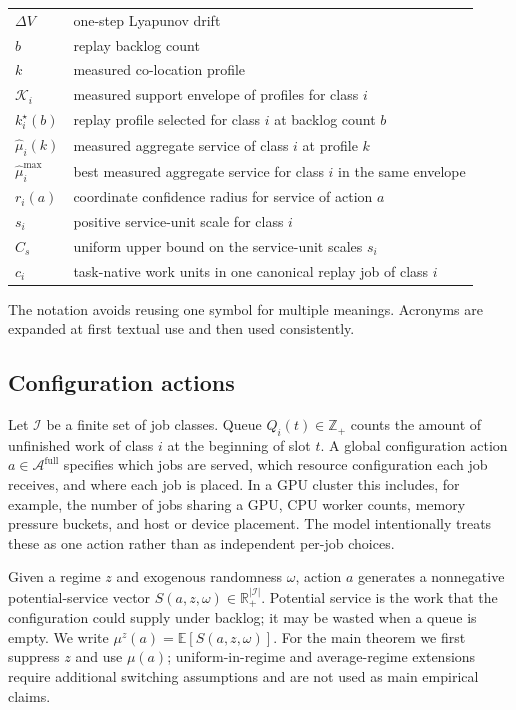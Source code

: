 \documentclass[opre,dblanonrev]{informs4}
\newcommand{\Afull}{\mathcal A^{\mathrm{full}}}
\newcommand{\Real}{\mathbb R}
\newcommand{\E}{\mathbb E}
\begin{document}
\begin{table}[t]
{\begin{tabular}{@{}p{}p{}@{}}
\(\Delta V\) & one-step Lyapunov drift \\
\(b\) & replay backlog count \\
\(k\) & measured co-location profile \\
\(\mathcal K_i\) & measured support envelope of profiles for class \(i\) \\
\(k_i^\star(b)\) & replay profile selected for class \(i\) at backlog count \(b\) \\
\(\widehat\mu_i(k)\) & measured aggregate service of class \(i\) at profile \(k\) \\
\(\widehat\mu_i^{\max}\) & best measured aggregate service for class \(i\) in the same envelope \\
\(r_i(a)\) & coordinate confidence radius for service of action \(a\) \\
\(s_i\) & positive service-unit scale for class \(i\) \\
\(C_s\) & uniform upper bound on the service-unit scales \(s_i\) \\
\(c_i\) & task-native work units in one canonical replay job of class \(i\) \\
\bottomrule
\end{tabular}
}{The notation avoids reusing one symbol for multiple meanings.  Acronyms are
expanded at first textual use and then used consistently.}
\end{table}

\subsection{Configuration actions}
\label{subsec:configuration-actions}

Let \(\mathcal I\) be a finite set of job classes.  Queue \(Q_i(t)\in\mathbb Z_+\)
counts the amount of unfinished work of class \(i\) at the beginning of slot
\(t\).  A global configuration action \(a\in\Afull\) specifies which jobs are
served, which resource configuration each job receives, and where each job is
placed.  In a GPU cluster this includes, for example, the number of jobs sharing
a GPU, CPU worker counts, memory pressure buckets, and host or device placement.
The model intentionally treats these as one action rather than as independent
per-job choices.

Given a regime \(z\) and exogenous randomness \(\omega\), action \(a\) generates
a nonnegative potential-service vector
\(S(a,z,\omega)\in\Real_+^{|\mathcal I|}\).  Potential service is the work that
the configuration could supply under backlog; it may be wasted when a queue is
empty.  We write
\(\mu^z(a)=\E[S(a,z,\omega)]\).  For the main theorem we first suppress \(z\)
and use \(\mu(a)\); uniform-in-regime and average-regime extensions require
additional switching assumptions and are not used as main empirical claims.
\end{document}
